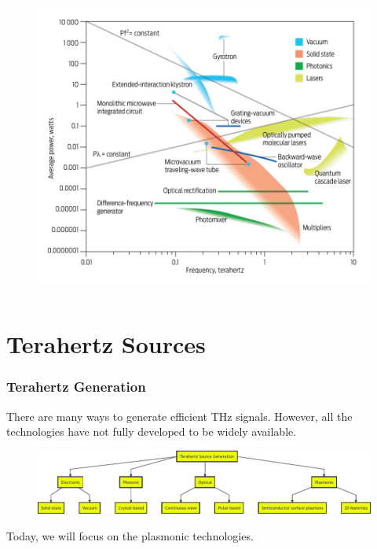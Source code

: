 \documentclass[10pt]{beamer}
\begin{document}
\begin{frame}
\begin{columns}
\begin{column}{.44\textwidth}
\begin{figure}
                \includegraphics[width=.95\textwidth]{sources_and_power.jpeg}
                \label{fig:sources_power}
            \end{figure}
        \end{column}
    \end{columns}

\end{frame}

\section{Terahertz Sources}


\begin{frame}
    \frametitle{Terahertz Generation}

    There are many ways to generate efficient THz signals. However, all the technologies have not fully developed to be widely available.
    \begin{figure}[h!]
        \centering
        \includegraphics[width=1\textwidth]{terahertz_sources.pdf}
    \end{figure}
    Today, we will focus on the plasmonic technologies.
\end{frame}
\end{document}
